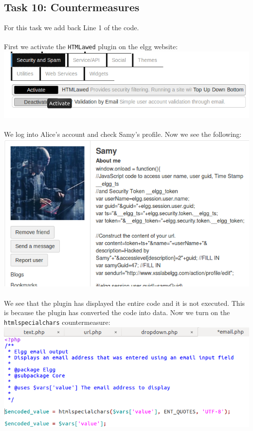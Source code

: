 \documentclass[a4paper]{article}
\begin{document}
\subsection{Task 10: Countermeasures}
For this task we add back Line 1 of the code.\\\\
First we activate the \verb+HTMLawed+ plugin on the elgg website:\\
\includegraphics[scale=0.7]{2/25.png}\\\\
We log into Alice's account and check Samy's profile. Now we see the following:\\
\pagebreak
\includegraphics[scale=0.7]{2/26.png}\\\\
We see that the plugin has displayed the entire code and it is not executed. This is because the plugin has converted the code into data. Now we turn on the \verb+htmlspecialchars+ countermeasure:\\
\includegraphics[scale=0.7]{2/27.png}\\\\
\end{document}
